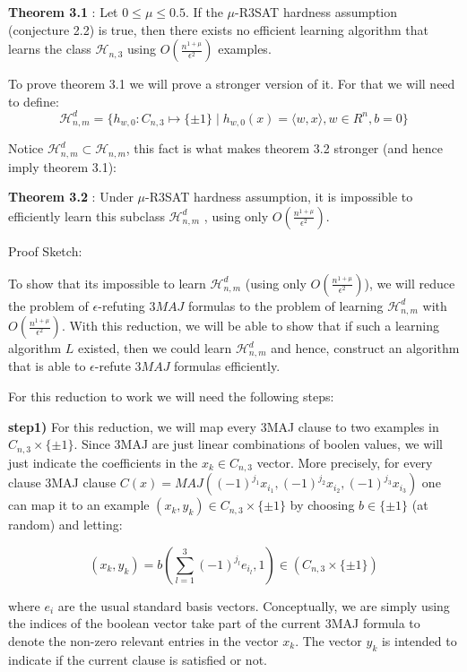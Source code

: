\documentclass[11pt,a4paper]{article}
\begin{document}
\textbf{Theorem 3.1 }: Let $0 \leq \mu \leq 0.5$. If the $\mu$-R3SAT hardness assumption (conjecture 2.2) is true, then there exists no efficient learning algorithm that learns the class $\mathcal{H}_{n,3}$ using $O \left(  \frac{n^{1 + \mu }}{\epsilon^2} \right)$ examples.

To prove theorem 3.1 we will prove a stronger version of it. For that we will need to define:
$$ \mathcal{H}^d_{n,m} = \{ h_{w,0} : C_{n, 3} \mapsto \{ \pm 1\} \mid h_{w,0}(x) = \langle w, x \rangle, w \in R^n, b = 0 \}$$

Notice $\mathcal{H}^d_{n,m} \subset \mathcal{H}_{n,m}$, this fact is what makes theorem 3.2 stronger (and hence imply theorem 3.1):

\textbf{Theorem 3.2 }: Under $\mu$-R3SAT hardness assumption, it is impossible to efficiently learn this subclass  $\mathcal{H}^d_{n,m}$ , using only $O \left(  \frac{n^{1 + \mu }}{\epsilon^2} \right)$.

Proof Sketch:

To show that its impossible to learn $\mathcal{H}^d_{n,m}$ (using only $O \left(  \frac{n^{1 + \mu }}{\epsilon^2} \right)$), we will reduce the problem of $\epsilon$-refuting $3MAJ$ formulas to the problem of learning $\mathcal{H}^d_{n,m}$ with $O \left(  \frac{n^{1 + \mu }}{\epsilon^2} \right)$. With this reduction, we will be able to show that if such a learning algorithm $L$ existed, then we could learn $\mathcal{H}^d_{n,m}$ and hence, construct an algorithm that is able to $\epsilon$-refute $3MAJ$ formulas efficiently.

For this reduction to work we will need the following steps:

\textbf{step1)} For this reduction, we will map every 3MAJ clause to two examples in $C_{n,3} \times \{ \pm 1 \}$. Since 3MAJ are just linear combinations of boolen values, we will just indicate the coefficients in the $x_k \in C_{n,3}$ vector. More precisely, for every clause 3MAJ clause $ C(x) = MAJ( (-1)^{j_1}x_{i_1} , (-1)^{j_2}x_{i_2} , (-1)^{j_3}x_{i_3} )$ one can map it to an example $(x_k , y_k) \in C_{n , 3} \times \{ \pm 1\}$ by choosing $b \in \{ \pm 1\}$ (at random) and letting:

$$(x_k, y_k) = b (\sum^3_{l=1} (-1)^{j_l} e_{i_l}, 1) \in (C_{n,3} \times \{ \pm 1 \})$$

where $e_i$ are the usual standard basis vectors.
Conceptually, we are simply using the indices of the boolean vector take part of the current 3MAJ formula to denote the non-zero relevant entries in the vector $x_k$.
The vector $y_k$ is intended to indicate if the current clause is satisfied or not.
\end{document}
